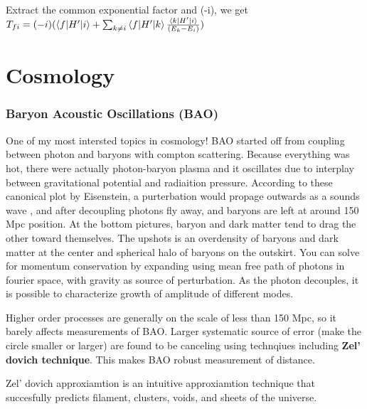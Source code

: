\documentclass[11pt]{article}
\begin{document}
Extract the common exponential factor and (-i), we get $T_{fi} = (-i) (\braket{f|H'|i}+ \sum_{k\neq i}\braket{f|H'|k}\frac{\braket{k|H'|i}}{(E_k-E_i)})$
\part{Cosmology}
\section{Baryon Acoustic Oscillations (BAO) \cite{BassetBAO}}
One of my most intersted topics in cosmology! 
BAO started off from coupling between photon and baryons with compton scattering. Because everything was hot, there were actually photon-baryon plasma
 and it oscillates due to interplay between gravitational potential and radiaition pressure. 
According to these canonical plot 
by Eisenstein, a purterbation would propage outwards as a sounds wave , and after decoupling photons
fly away, and baryons are left at around 150 Mpc position. At the bottom pictures, baryon and dark matter tend to drag the other toward themselves. The upshots is an overdensity of baryons and dark matter at the center and spherical halo of baryons on the outskirt.
You can solve for momentum conservation by expanding using mean free path of photons in fourier space, with gravity as source of perturbation. 
As the photon decouples, it is possible to characterize growth of amplitude of different modes.  

Higher order processes are generally on the scale of less than 150 Mpc, so it barely affects measurements of BAO. Larger systematic source of error (make the circle smaller or larger) are found to be canceling using technqiues including \textbf{Zel' dovich technique}. 
This makes BAO robust measurement of distance. 

Zel' dovich approxiamtion is an intuitive approxiamtion technique that succesfully predicts filament, clusters, voids, and sheets of the universe. 
\end{document}
